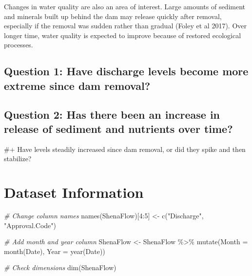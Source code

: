 \documentclass[
  12pt,
]{article}
\newenvironment{Shaded}{\begin{snugshade}}{\end{snugshade}}
\newcommand{\AttributeTok}[1]{\textcolor[rgb]{0.77,0.63,0.00}{#1}}
\newcommand{\CommentTok}[1]{\textcolor[rgb]{0.56,0.35,0.01}{\textit{#1}}}
\newcommand{\DecValTok}[1]{\textcolor[rgb]{0.00,0.00,0.81}{#1}}
\newcommand{\FunctionTok}[1]{\textcolor[rgb]{0.00,0.00,0.00}{#1}}
\newcommand{\NormalTok}[1]{#1}
\newcommand{\OtherTok}[1]{\textcolor[rgb]{0.56,0.35,0.01}{#1}}
\newcommand{\SpecialCharTok}[1]{\textcolor[rgb]{0.00,0.00,0.00}{#1}}
\newcommand{\StringTok}[1]{\textcolor[rgb]{0.31,0.60,0.02}{#1}}
\begin{document}
Changes in water quality are also an area of interest. Large amounts of
sediment and minerals built up behind the dam may release quickly after
removal, especially if the removal was sudden rather than gradual (Foley
et al 2017). Over longer time, water quality is expected to improve
because of restored ecological processes.

\hypertarget{question-1-have-discharge-levels-become-more-extreme-since-dam-removal}{%
\subsection{Question 1: Have discharge levels become more extreme since
dam
removal?}\label{question-1-have-discharge-levels-become-more-extreme-since-dam-removal}}

\hypertarget{question-2-has-there-been-an-increase-in-release-of-sediment-and-nutrients-over-time}{%
\subsection{Question 2: Has there been an increase in release of
sediment and nutrients over
time?}\label{question-2-has-there-been-an-increase-in-release-of-sediment-and-nutrients-over-time}}

\#+ Have levels steadily increased since dam removal, or did they spike
and then stabilize?

\newpage

\hypertarget{dataset-information}{%
\section{Dataset Information}\label{dataset-information}}

\begin{Shaded}
\begin{Highlighting}[]
\CommentTok{\# Change column names}
\FunctionTok{names}\NormalTok{(ShenaFlow)[}\DecValTok{4}\SpecialCharTok{:}\DecValTok{5}\NormalTok{] }\OtherTok{\textless{}{-}} \FunctionTok{c}\NormalTok{(}\StringTok{"Discharge"}\NormalTok{, }\StringTok{"Approval.Code"}\NormalTok{)}

\CommentTok{\# Add month and year column}
\NormalTok{ShenaFlow }\OtherTok{\textless{}{-}}\NormalTok{ ShenaFlow }\SpecialCharTok{\%\textgreater{}\%}
  \FunctionTok{mutate}\NormalTok{(}\AttributeTok{Month =} \FunctionTok{month}\NormalTok{(Date),}
         \AttributeTok{Year =} \FunctionTok{year}\NormalTok{(Date))}

\CommentTok{\# Check dimensions}
\FunctionTok{dim}\NormalTok{(ShenaFlow)}
\end{Highlighting}
\end{Shaded}
\end{document}
